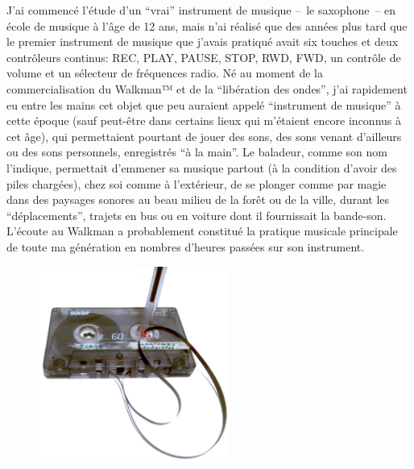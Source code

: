 \noindent J'ai commencé l'étude d'un ``vrai'' instrument de musique --~le saxophone~-- en école de musique à l'âge de 12 ans, mais n'ai réalisé que des années plus tard que le premier instrument de musique que j'avais pratiqué avait six touches et deux contrôleurs continus: REC, PLAY, PAUSE, STOP, RWD, FWD, un contrôle de volume et un sélecteur de fréquences radio. Né au moment de la commercialisation du Walkman™ et de la ``libération des ondes'', j'ai rapidement eu entre les mains cet objet que peu auraient appelé ``instrument de musique'' à cette époque (sauf peut-être dans certains lieux qui m'étaient encore inconnus à cet âge), qui permettaient pourtant de jouer des sons, des sons venant d'ailleurs ou des sons personnels, enregistrés ``à la main''. Le baladeur, comme son nom l'indique, permettait d'emmener sa musique partout (à la condition d'avoir des piles chargées), chez soi comme à l'extérieur, de se plonger comme par magie dans des paysages sonores au beau milieu de la forêt ou de la ville, durant les ``déplacements'', trajets en bus ou en voiture dont il fournissait la bande-son. L'écoute au Walkman a probablement constitué la pratique musicale principale de toute ma génération en nombres d'heures passées sur son instrument.
\begin{figure}
	\vspace{-6.2em}
	\captionsetup{format=plain}
	\centering
 	\includegraphics[width=0.56\textwidth]{gfx/01_preamble/K7.png}
 	\label{fig:preamble:walkman}
\end{figure}
\par
